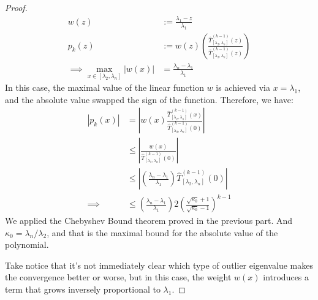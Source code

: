 \documentclass[]{article}
\theoremstyle{definition}
\begin{document}
            \begin{proof}
                \begin{align}
                    w(z) &:=  \frac{\lambda_1 - z}{\lambda_1} 
                    \\
                    p_k(z) &:= w(z)\left(
                        \frac{\hat{T}_{[\lambda_2, \lambda_n]}^{(k - 1)}(z)}
                        {
                            \hat{T}_{[\lambda_2, \lambda_n]}^{(k - 1)}(z)
                        }
                    \right)
                    \\\implies
                    \max_{x\in[\lambda_2, \lambda_n]} |w(x)| &=
                    \frac{\lambda_n - \lambda_1}{\lambda_1}
                \end{align}
                In this case, the maximal value of the linear function $w$ is achieved via $x = \lambda_1$, and the absolute value swapped the sign of the function. Therefore, we have: 
                \begin{align}
                    |p_k(x)| &= 
                    \left|
                        w(x) 
                        \frac{\hat{T}_{[\lambda_2, \lambda_n]}^{(k - 1)}(x)}
                        {
                            \hat{T}_{[\lambda_2, \lambda_n]}^{(k - 1)}(0)
                        }
                    \right|
                    \\
                    &\le 
                    \left|
                        \frac{w(x)}{\hat{T}_{[\lambda_2, \lambda_n]}^{(k - 1)}(0)}
                    \right|
                    \\
                    & \le
                    \left| 
                        \left(
                            \frac{\lambda_n - \lambda_1}{\lambda_1}
                        \right)
                        \hat{T}_{[\lambda_2, \lambda_n]}^{(k - 1)}(0)
                    \right|
                    \\
                    \implies 
                    & \le   
                    \left(
                        \frac{\lambda_n - \lambda_1}{\lambda_1}
                    \right)
                    2\left(
                        \frac{\sqrt{\kappa_0} + 1}{\sqrt{\kappa_0} - 1}
                    \right)^{k - 1}
                \end{align}
                We applied the Chebyshev Bound theorem proved in the previous part. And $\kappa_0 = \lambda_n/\lambda_2$, and that is the maximal bound for the absolute value of the polynomial.
                \par
                Take notice that it's not immediately clear which type of outlier eigenvalue makes the convergence better or worse, but in this case, the weight $w(x)$ introduces a term that grows inversely proportional to $\lambda_1$. 
            \end{proof}
\end{document}
